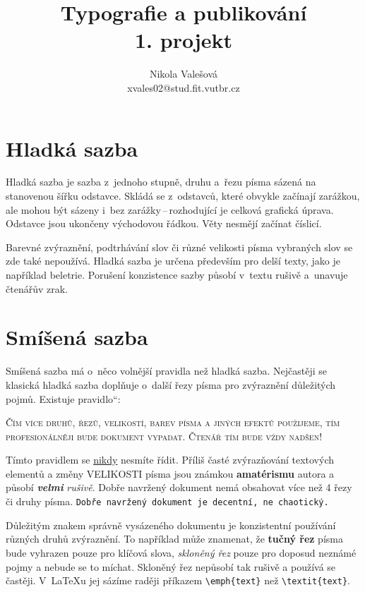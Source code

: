 \documentclass[a4paper,11pt,twocolumn]{article}[24. 2. 2016]
\title{Typografie a publikování \\[0.2mm]
1. projekt}
\author{Nikola Valešová \\[0.2mm]
xvales02@stud.fit.vutbr.cz}
\date{}
\newcommand{\myuv}[1]{\quotedblbase #1\textquotedblleft}
\begin{document}
\maketitle

\section{Hladká sazba}

Hladká sazba je sazba z~jednoho stupně, druhu a~řezu písma sázená na stanovenou šířku odstavce. Skládá se z~odstavců, které obvykle začínají zarážkou, ale mo\-hou být sázeny i~bez zarážky\,--\,rozhodující je celková grafická úprava. Odstavce jsou ukončeny východovou řádkou. Věty nesmějí začínat číslicí.

Barevné zvýraznění, podtrhávání slov či různé velikosti písma vybraných slov se zde také nepoužívá. Hladká sazba je určena především pro delší texty, jako je například beletrie. Porušení konzistence sazby pů\-so\-bí v~textu rušivě a~unavuje čtenářův zrak.

\section{Smíšená sazba}

Smíšená sazba má o~něco volnější pravidla než hladká sazba. Nejčastěji se klasická hladká sazba doplňuje o~další řezy písma pro zvýraznění důležitých pojmů. Existuje \myuv{pravidlo}:

\begin{center}
\begin{minipage}[c]{6.6cm}
\parindent=0.5cm
\indent \textsc{Čím více druhů, řezů, velikostí, barev písma a jiných efektů použijeme, tím profesionálněji bude  do\-ku\-ment vypadat. Čtenář tím bude vždy nadšen!}
\end{minipage}
\end{center}

Tímto pravidlem se \underline{nikdy} nesmíte řídit. Pří\-liš časté zvýrazňování textových elementů  a změny {\huge V}{\LARGE E}{\Large L}{\large I}{\normalsize K}{\small O}{\footnotesize S}{\scriptsize T}{\tiny I} písma {\Large jsou} {\LARGE známkou} {\LARGE \bfseries amatérismu} autora a působí {\itshape \bfseries velmi} {\itshape rušivě}. Dobře na\-vr\-že\-ný dokument nemá obsahovat více než 4 řezy či druhy písma. \texttt{Dobře navržený dokument je decentní, ne chaotický.}

Důležitým znakem správně vysázeného dokumentu je konzistentní používání různých druhů zvýraznění. To například může znamenat, že \textbf{tučný řez} písma bude vyhrazen pouze pro klíčová slova, \textit{skloněný řez} pouze pro doposud neznámé pojmy a nebude se to míchat. Skloněný řez nepůsobí tak rušivě a používá se častěji. V~\LaTeX u jej sázíme raději příkazem \verb|\emph{text}| než \verb|\textit{text}|.
\end{document}
